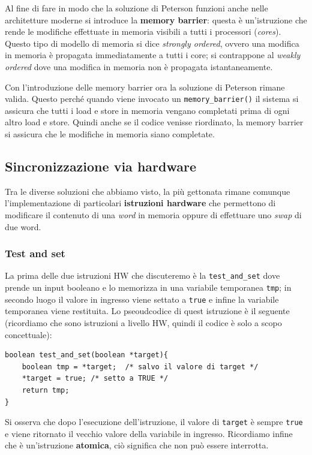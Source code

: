 Al fine di fare in modo che la soluzione di Peterson funzioni anche nelle architetture moderne si introduce la \textbf{memory barrier}: questa è un'istruzione che rende le modifiche effettuate in memoria visibili a tutti i processori (\textit{cores}). Questo tipo di modello di memoria si dice \textit{strongly ordered}, ovvero una modifica in memoria è propagata immediatamente a tutti i core; si contrappone al \textit{weakly ordered} dove una modifica in memoria non è propagata istantaneamente. 

Con l'introduzione delle memory barrier ora la soluzione di Peterson rimane valida. Questo perché quando viene invocato un \texttt{memory\_barrier()} il sistema si assicura che tutti i load e store in memoria vengano completati prima di ogni altro load e store. Quindi anche se il codice venisse riordinato, la memory barrier si assicura che le modifiche in memoria siano completate. 
% 
\subsection{Sincronizzazione via hardware}
Tra le diverse soluzioni che abbiamo visto, la più gettonata rimane comunque l'implementazione di particolari \textbf{istruzioni hardware} che permettono di modificare il contenuto di una \textit{word} in memoria oppure di effettuare uno \textit{swap} di due word.

\subsubsection{Test and set}
La prima delle due istruzioni HW che discuteremo è la \texttt{test\_and\_set} dove prende un input booleano e lo memorizza in una variabile temporanea \texttt{tmp}; in secondo luogo il valore in ingresso viene settato a \texttt{true} e infine la variabile temporanea viene restituita. Lo pseoudcodice di quest istruzione è il seguente (ricordiamo che sono istruzioni a livello HW, quindi il codice è solo a scopo concettuale):
\begin{lstlisting}
boolean test_and_set(boolean *target){
    boolean tmp = *target;  /* salvo il valore di target */ 
    *target = true; /* setto a TRUE */
    return tmp;
}
\end{lstlisting}
Si osserva che dopo l'esecuzione dell'istruzione, il valore di \texttt{target} è sempre \texttt{true} e viene ritornato il vecchio valore della variabile in ingresso. Ricordiamo infine che è un'istruzione \textbf{atomica}, ciò significa che non può essere interrotta.

